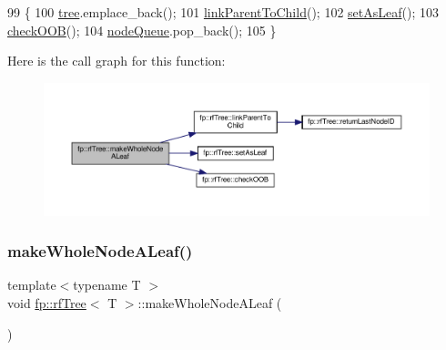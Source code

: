 \begin{DoxyCode}
99                                                 \{
100                     \hyperlink{classfp_1_1rfTree_a1d5c209715f4044a85878c17e2b3ee53}{tree}.emplace\_back();
101                     \hyperlink{classfp_1_1rfTree_aceaedc5d54bb429c1a3539f164a93d45}{linkParentToChild}();
102                     \hyperlink{classfp_1_1rfTree_a3583e1f1659ba9a9013a4891709bacb9}{setAsLeaf}();
103                     \hyperlink{classfp_1_1rfTree_a45e47b318c90a1359840ab6161f20ab1}{checkOOB}();
104                     \hyperlink{classfp_1_1rfTree_af72d0a2f930fd480dfb4858885c2df23}{nodeQueue}.pop\_back();
105                 \}
\end{DoxyCode}
Here is the call graph for this function\+:
\nopagebreak
\begin{figure}[H]
\begin{center}
\leavevmode
\includegraphics[width=350pt]{classfp_1_1rfTree_a2b2a47186c0784415609f1c9b005e702_cgraph}
\end{center}
\end{figure}
\mbox{\label{classfp_1_1rfTree_a2b2a47186c0784415609f1c9b005e702}} 
\subsubsection{\texorpdfstring{make\+Whole\+Node\+A\+Leaf()}{makeWholeNodeALeaf()}\hspace{0.1cm}{\footnotesize\ttfamily [2/2]}}
{\footnotesize\ttfamily template$<$typename T $>$ \\
void \hyperlink{classfp_1_1rfTree}{fp\+::rf\+Tree}$<$ T $>$\+::make\+Whole\+Node\+A\+Leaf (\begin{DoxyParamCaption}{ }\end{DoxyParamCaption})\hspace{0.3cm}{\ttfamily [inline]}}



